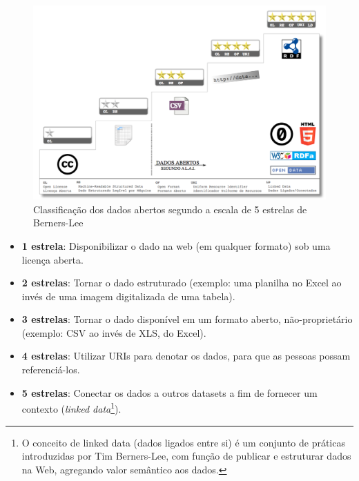 \begin{figure}
  \centering
  \includegraphics[width=1.0\textwidth]{imagens/open_data_stars.png}
  \caption{Classificação dos dados abertos segundo a escala de 5 estrelas de Berners-Lee}
  \label{fig:LABEL_FIG_OPEN_STARS}
\end{figure}

\begin{itemize}

\item \textbf{1 estrela}: Disponibilizar o dado na web (em qualquer formato) sob uma licença aberta.

\item \textbf{2 estrelas}: Tornar o dado estruturado (exemplo: uma planilha no Excel ao invés de uma imagem digitalizada de uma tabela).

\item \textbf{3 estrelas}: Tornar o dado disponível em um formato aberto, não-proprietário (exemplo: CSV ao invés de XLS, do Excel).

\item \textbf{4 estrelas}: Utilizar URIs para denotar os dados, para que as pessoas possam referenciá-los.

\item \textbf{5 estrelas}: Conectar os dados a outros datasets a fim de fornecer um contexto (\textit{linked data}\footnote{O conceito de linked data (dados ligados entre si) é um conjunto de práticas introduzidas por Tim Berners-Lee, com função de publicar e estruturar dados na Web, agregando valor semântico aos dados.}).

\end{itemize}



